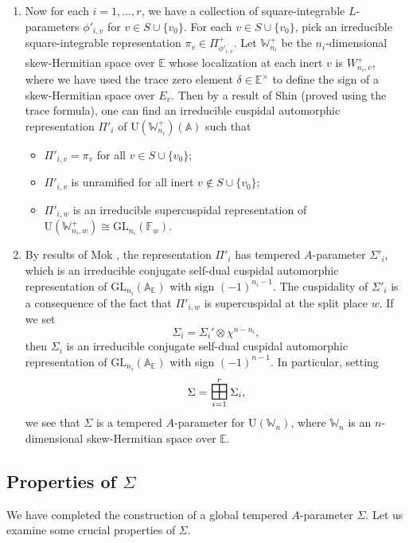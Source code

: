 \documentclass[11pt]{amsart}
\numberwithin{equation}{section}
\theoremstyle{plain}
\theoremstyle{definition}
\theoremstyle{remark}
\def\GL{\mathrm{GL}}
\def\U{\mathrm{U}}
\def\AA{\mathbb{A}}
\def\EE{\mathbb{E}}
\def\FF{\mathbb{F}}
\def\WW{\mathbb{W}}
\newcommand{\BIGboxplus}{\mathop{\mathchoice%
{\raise-0.35em\hbox{\huge $\boxplus$}}%
{\raise-0.15em\hbox{\Large $\boxplus$}}{\hbox{\large $\boxplus$}}{\boxplus}}}
\begin{document}
\begin{enumerate}
\item Now for each $i=1, \ldots, r$, we have a collection of square-integrable $L$-parameters $\phi'_{i,v}$ for $v \in S \cup \{ v_0 \}$.
For each $v \in S \cup \{ v_0 \}$, pick an irreducible square-integrable representation $\pi_v \in \Pi_{\phi'_{i,v}}^+$.
Let $\WW_{n_i}^+$ be the $n_i$-dimensional skew-Hermitian space over $\EE$ whose localization at each inert $v$ is $W_{n_i,v}^+$, where we have used the trace zero element $\delta \in \EE^{\times}$ to define the sign of a skew-Hermitian space over $E_v$.
Then by a result of Shin \cite[Theorem 5.13]{sh} (proved using the trace formula), one can find an irreducible cuspidal automorphic representation $\Pi'_i$ of $\U(\WW_{n_i}^+)(\AA)$ such that
\begin{itemize}
\item $\Pi'_{i,v}  = \pi_v$ for all $v \in S\cup \{ v_0 \}$;
\item $\Pi'_{i,v}$ is unramified for all inert $v \notin S \cup \{ v_0 \}$;
\item $\Pi'_{i,w}$ is an irreducible supercuspidal representation of $\U(\WW_{n_i,w}^+) \cong \GL_{n_i}(\FF_w)$. 
\end{itemize}

\item By results of Mok \cite{mok}, the representation $\Pi'_i$ has tempered $A$-parameter $\Sigma'_i$, which is an irreducible conjugate self-dual cuspidal automorphic representation of $\GL_{n_i}(\AA_{\EE})$ with sign $(-1)^{n_i-1}$.
The cuspidality of $\Sigma'_i$ is a consequence of the fact that $\Pi'_{i,w}$ is supercuspidal at the split place $w$. If we set
\[  \Sigma_i  = \Sigma_i' \otimes \chi^{n-n_i}, \]
then $\Sigma_i$ is an irreducible conjugate self-dual cuspidal automorphic representation of $\GL_{n_i}(\AA_{\EE})$ with sign $(-1)^{n-1}$.
In particular, setting
\[  \Sigma  = \BIGboxplus_{i=1}^r  \Sigma_i, \]
we see that $\Sigma$ is a tempered $A$-parameter for $\U(\WW_n)$, where $\WW_n$ is an $n$-dimensional skew-Hermitian space over $\EE$. 
\end{enumerate}
 
\subsection{Properties of $\Sigma$}
\label{SS:Sigma}

We have completed the construction of a global tempered $A$-parameter $\Sigma$. Let us examine some crucial properties of $\Sigma$. 
\end{document}
